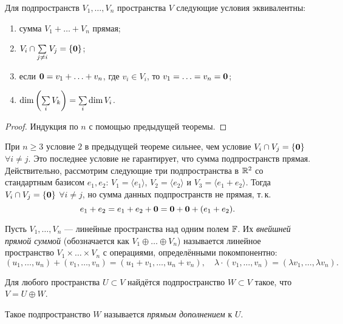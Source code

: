 \begin{theorem}
    Для подпространств $V_1, \ldots, V_n$ пространства $V$ следующие условия эквивалентны:
    \begin{enumerate}[nolistsep]
        \item сумма $V_1 + \ldots + V_n$ прямая;
        \item $V_i \cap \sum\limits_{j \ne i}V_j = \{\boldsymbol{0}\}$;
        \item если $\boldsymbol{0} = v_1 + \ldots + v_n$, где $v_i \in V_i$, то $v_1 = \ldots = v_n = \boldsymbol{0}$;
        \item $\dim\left(\sum\limits_iV_k\right) = \sum\limits_i\dim V_i$.
    \end{enumerate}
\end{theorem}

\begin{proof}
    Индукция по $n$ с помощью предыдущей теоремы.
\end{proof}

\begin{remark}
    При $n \geqslant 3$ условие $2$ в предыдущей теореме сильнее, чем условие $V_i \cap V_j = \{\boldsymbol{0}\}$ $\forall i \ne j$. Это последнее условие не гарантирует, что сумма подпространств прямая. Действительно, рассмотрим следующие три подпространства в $\mathbb{R}^2$ со стандартным базисом $e_1, e_2$: $V_1 = \langle e_1\rangle$, $V_2 = \langle e_2\rangle$ и $V_3 = \langle e_1 + e_2\rangle$. Тогда $V_i \cap V_j = \{\boldsymbol{0}\}$ $\forall i \ne j$, но сумма данных подпространств не прямая, т.\,к. \[e_1 + e_2 = e_1 + e_2 + \boldsymbol{0} = \boldsymbol{0} + \boldsymbol{0} + (e_1 + e_2).\]
\end{remark}

\begin{definition}
    Пусть $V_1, \ldots, V_n$ --- линейные пространства над одним полем $\mathbb{F}$. Их \textit{внейшней прямой суммой} (обозначается как $V_1 \oplus \ldots \oplus V_n$) называется линейное пространство $V_1 \times \ldots \times V_n$ с операциями, определёнными покомпонентно:
    \[
        (u_1, \ldots, u_n) + (v_1, \ldots, v_n) = (u_1 + v_1, \ldots, u_n + v_n),\quad \lambda \cdot (v_1, \ldots, v_n) = (\lambda v_1, \ldots, \lambda v_n).
    \]
\end{definition}

\begin{proposal}
    Для любого пространства $U \subset V$ найдётся подпространство $W \subset V$ такое, что $V = U \oplus W$.
\end{proposal}

\begin{definition}
    Такое подпространство $W$ называется \textit{прямым дополнением} к $U$.
\end{definition}

